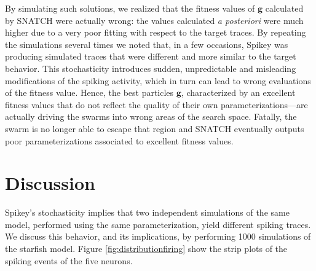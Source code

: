 \documentclass[utf8]{frontiersFPHY} %
\newcommand {\name}{SNATCH}
\begin{document}
By simulating such solutions,
we realized that the fitness values of $\textbf{g}$ calculated by \name{} were actually wrong: the values calculated \emph{a posteriori}  were much higher due to a very poor fitting with respect to the target traces.
By repeating the simulations several times
we noted that, in a few occasions,  Spikey was producing simulated traces that were different
and more similar to the target behavior.
This stochasticity
introduces  sudden, unpredictable and misleading modifications of the spiking activity, which in turn can lead to wrong evaluations of the fitness value.
Hence, the best particles $\textbf{g}$, 
characterized by an excellent fitness values that do not reflect the quality of their own parameterizations---are actually driving the swarms into wrong areas of the search space.
Fatally, the swarm is no longer able to escape that region and \name{} eventually outputs poor
parameterizations associated to excellent fitness values.


\section{Discussion}
\label{sec:discussion}
Spikey's  stochasticity
implies that two independent simulations of the same model, performed using the same parameterization, yield different spiking traces.
We discuss this behavior, and its implications, by performing 1000 simulations of the starfish model. 
Figure \ref{fig:distributionfiring} show the strip plots of the spiking events of the five neurons. 
\end{document}
